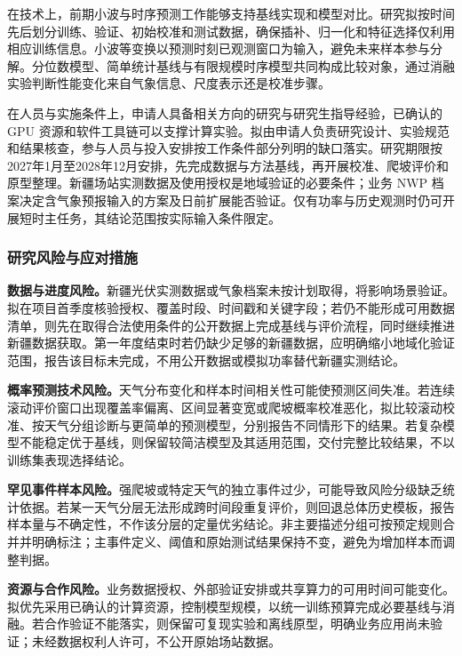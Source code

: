 在技术上，前期小波与时序预测工作能够支持基线实现和模型对比。研究拟按时间先后划分训练、验证、初始校准和测试数据，确保插补、归一化和特征选择仅利用相应训练信息。小波等变换以预测时刻已观测窗口为输入，避免未来样本参与分解。分位数模型、简单统计基线与有限规模时序模型共同构成比较对象，通过消融实验判断性能变化来自气象信息、尺度表示还是校准步骤。

在人员与实施条件上，申请人具备相关方向的研究与研究生指导经验，已确认的 GPU 资源和软件工具链可以支撑计算实验。拟由申请人负责研究设计、实验规范和结果核查，参与人员与投入安排按工作条件部分列明的缺口落实。研究期限按2027年1月至2028年12月安排，先完成数据与方法基线，再开展校准、爬坡评价和原型整理。新疆场站实测数据及使用授权是地域验证的必要条件；业务 NWP 档案决定含气象预报输入的方案及日前扩展能否验证。仅有功率与历史观测时仍可开展短时主任务，其结论范围按实际输入条件限定。

\subsubsection{研究风险与应对措施}
\textbf{数据与进度风险。}新疆光伏实测数据或气象档案未按计划取得，将影响场景验证。拟在项目首季度核验授权、覆盖时段、时间戳和关键字段；若仍不能形成可用数据清单，则先在取得合法使用条件的公开数据上完成基线与评价流程，同时继续推进新疆数据获取。第一年度结束时若仍缺少足够的新疆数据，应明确缩小地域化验证范围，报告该目标未完成，不用公开数据或模拟功率替代新疆实测结论。

\textbf{概率预测技术风险。}天气分布变化和样本时间相关性可能使预测区间失准。若连续滚动评价窗口出现覆盖率偏离、区间显著变宽或爬坡概率校准恶化，拟比较滚动校准、按天气分组诊断与更简单的预测模型，分别报告不同情形下的结果。若复杂模型不能稳定优于基线，则保留较简洁模型及其适用范围，交付完整比较结果，不以训练集表现选择结论。

\textbf{罕见事件样本风险。}强爬坡或特定天气的独立事件过少，可能导致风险分级缺乏统计依据。若某一天气分层无法形成跨时间段重复评价，则回退总体历史模板，报告样本量与不确定性，不作该分层的定量优劣结论。非主要描述分组可按预定规则合并并明确标注；主事件定义、阈值和原始测试结果保持不变，避免为增加样本而调整判据。

\textbf{资源与合作风险。}业务数据授权、外部验证安排或共享算力的可用时间可能变化。拟优先采用已确认的计算资源，控制模型规模，以统一训练预算完成必要基线与消融。若合作验证不能落实，则保留可复现实验和离线原型，明确业务应用尚未验证；未经数据权利人许可，不公开原始场站数据。
